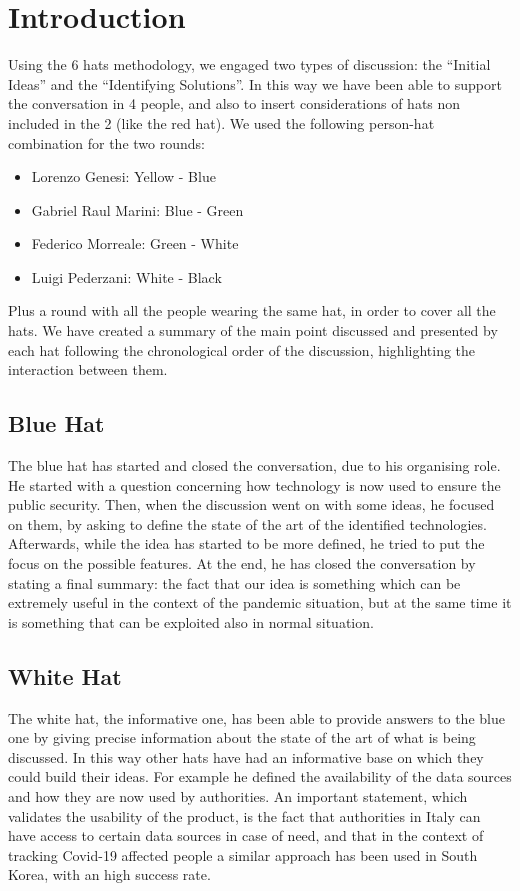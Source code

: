 \documentclass[../main.tex]{subfiles}
\begin{document}
    \section{Introduction}\label{sec:introduction2}
    Using the 6 hats methodology, we engaged two types of discussion: the “Initial Ideas” and the “Identifying Solutions”. In this way we have been able to support the conversation in 4 people, and also to insert considerations of hats non included in the 2 (like the red hat).
    We used the following person-hat combination for the two rounds:
    \begin{itemize}
        \item Lorenzo Genesi: Yellow - Blue
        \item Gabriel Raul Marini: Blue - Green
        \item Federico Morreale: Green - White
        \item Luigi Pederzani: White - Black
    \end{itemize}
    Plus a round with all the people wearing the same hat, in order to cover all the hats.
    We have created a summary of the main point discussed and presented by each hat following the chronological order of the discussion, highlighting the interaction between them.


    \subsection{Blue Hat}\label{subsec:blue-hat}
    The blue hat has started and closed the conversation, due to his organising role. He started with a question concerning how technology is now used to ensure the public security. Then, when the discussion went on with some ideas, he focused on them, by asking to define the state of the art of the identified technologies. Afterwards, while the idea has started to be more defined, he tried to put the focus on the possible features.
    At the end, he has closed the conversation by stating a final summary: the fact that our idea is something which can be extremely useful in the context of the pandemic situation, but at the same time it is something that can be exploited also in normal situation.


    \subsection{White Hat}\label{subsec:white-hat}
    The white hat, the informative one, has been able to provide answers to the blue one by giving precise information about the state of the art of what is being discussed. In this way other hats have had an informative base on which they could build their ideas. For example he defined the availability of the data sources and how they are now used by authorities. An important statement, which validates the usability of the product, is the fact that authorities in Italy can have access to certain data sources in case of need, and that in the context of tracking Covid-19 affected people a similar approach has been used in South Korea, with an high success rate.
\end{document}
